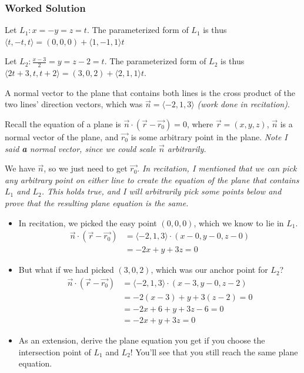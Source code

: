 \documentclass[]{mangos-musings}
\begin{document}
\subsubsection*{Worked Solution}


Let $L_1: x=-y=z = t$. The parameterized form of $L_1$ is thus $\langle t, -t, t\rangle = (0, 0, 0) + \langle 1, -1, 1\rangle t$

Let $L_2: \frac{x-3}{2}=y=z-2 = t$. The parameterized form of $L_2$ is thus $\langle2t + 3, t, t + 2 \rangle = (3, 0, 2) + \langle2, 1, 1\rangle t$.

A normal vector to the plane that contains both lines is the cross product of the two lines' direction vectors, which was $\vec{n} = \langle -2, 1, 3\rangle$ \textit{(work done in recitation)}.

Recall the equation of a plane is $\vec{n} \cdot (\vec{r} - \vec{r_0}) = 0$, where $\vec{r} = (x, y, z)$, $\vec{n}$
is a normal vector of the plane, and $\vec{r_0}$ is some arbitrary point in the plane.
\textit{Note I said \textbf{a} normal vector, since we could scale $\vec{n}$ arbitrarily.}

We have $\vec{n}$, so we just need to get $\vec{r_0}$. 
\textit{In recitation, I mentioned that we can pick any arbitrary point on either line to create the equation of the plane that contains $L_1$ and $L_2$. This holds true, and I will arbitrarily pick some points below and prove that the resulting plane equation is the same.} 
\begin{itemize}
  \item In recitation, we picked the easy point $(0, 0, 0)$, which we know to lie in $L_1$. 
  \begin{align*}
    \vec{n} \cdot (\vec{r} - \vec{r_0}) &= \langle -2, 1, 3 \rangle \cdot (x-0, y-0, z-0) 
    \\ &= -2x + y + 3z = 0
  \end{align*}
  \item But what if we had picked $(3, 0, 2)$, which was our anchor point for $L_2$?
  \begin{align*}
    \vec{n} \cdot (\vec{r} - \vec{r_0}) &= \langle -2, 1, 3 \rangle \cdot (x-3, y-0, z-2) 
    \\ &= -2(x-3) + y + 3(z-2) = 0
    \\ &= -2x + 6 + y + 3z - 6 = 0
    \\ &= -2x + y + 3z = 0 \tag{the $6$'s cancel!}
  \end{align*}
  \item As an extension, derive the plane equation you get if you choose the intersection point of $L_1$ and $L_2$! You'll see that you still reach the same plane equation.
\end{itemize}
\end{document}
